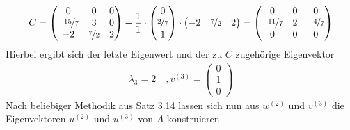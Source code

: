 \begin{colbox}
\begin{align*}
    C = \begin{pmatrix}
    0 & 0 & 0 \\ \nicefrac{-15}{7} & 3 & 0 \\ -2 & \nicefrac{7}{2} & 2
  \end{pmatrix} - \dfrac{1}{1}\cdot \begin{pmatrix}
      0 \\ \nicefrac{2}{7} \\ 1
    \end{pmatrix} \cdot \begin{pmatrix}
      -2 & \nicefrac{7}{2} & 2
    \end{pmatrix} = \left(\begin{matrix}
      0 & 0 & 0 \\
      \nicefrac{-11}{7} & 2 & \nicefrac{-4}{7} \\
      0 & 0 & 0
    \end{matrix}\right)
  \end{align*}
  Hierbei ergibt sich der letzte Eigenwert und der zu $C$ zugehörige Eigenvektor
  \begin{align*}
    \lambda_3=2 \quad, v^{(3)}=\begin{pmatrix}
      0 \\ 1 \\ 0
    \end{pmatrix}
  \end{align*}
  Nach beliebiger Methodik aus Satz 3.14 lassen sich nun aus $w^{(2)}$ und $v^{(3)}$ die Eigenvektoren  $u^{(2)}$
  und $u^{(3)}$ von $A$ konstruieren.
\end{colbox}